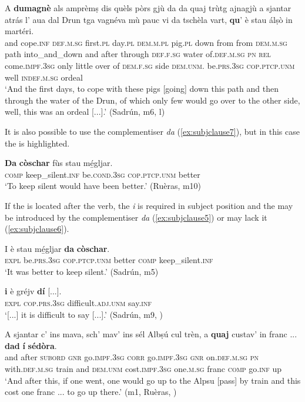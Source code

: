 \ea
\label{ex:subjclause4}
\gll    A \textbf{dumagnè} als amprèmṣ dis quèls pòrs gjù da da quaj trùtg ajnagjù a sjantar atrás l’ aua dal Drun tga vagnéva mù pauc vi da tschèla vart, \textbf{qu}’ è stau álṣò in martéri.\\
and cope.\textsc{inf} \textsc{def.m.sg} first.\textsc{pl}  day.\textsc{pl} \textsc{dem.m.pl}  pig.\textsc{pl} down from from \textsc{dem.m.sg} path into\_and\_down and after through \textsc{def.f.sg} water of.\textsc{def.m.sg}  \textsc{pn} \textsc{rel} come.\textsc{impf.3sg} only little over of \textsc{dem.f.sg} side \textsc{dem.unm.} be.\textsc{prs.3sg} \textsc{cop.ptcp.unm} well \textsc{indef.m.sg} ordeal \\
\glt `And the first days, to cope with these pigs [going] down this path and then through the water of the Drun, of which only few would go over to the other side, well, this was an ordeal [...].' (Sadrún, m6, l)
\z

It is also possible to use the complementiser \textit{da} (\ref{ex:subjclause7}), but in this case the  is highlighted.

\ea
\label{ex:subjclause7}
\gll \textbf{Da} \textbf{còschar} fùs stau mé̱gljar.\\
\textsc{comp} keep\_silent.\textsc{inf} be.\textsc{cond.3sg} \textsc{cop.ptcp.unm} better \\
\glt `To keep silent would have been better.' (Ruèras, m10)
\z

If the  is located after the verb, the  \textit{i} is required in subject position and the  may be introduced by the complementiser \textit{da} (\ref{ex:subjclause5}) or may lack it (\ref{ex:subjclause6}).

\ea
\label{ex:subjclause5}
\gll I è stau mé̱gljar \textbf{da} \textbf{còschar}.\\
\textsc{expl} be.\textsc{prs.3sg} \textsc{cop.ptcp.unm} better \textsc{comp} keep\_silent.\textsc{inf}\\
\glt `It was better to keep silent.' (Sadrún, m5)
\z

\ea
\label{ex:subjclause6}
\gll [...] \textbf{i} è gréjv \longrule {} \textbf{dí} [...].\\
 {} \textsc{expl} \textsc{cop.prs.3sg} difficult.\textsc{adj.unm} {} say.\textsc{inf}\\
\glt `[...] it is difficult to say [...].' (Sadrún, m9, )
\z

\ea
\label{ex:subjclause9}
\gll    A sjantar c’ ins mava, sch’ mav’ ins sél Albṣú cul trèn, a \textbf{quaj} custav’ in franc ... \textbf{dad} \textbf{í} \textbf{sédòra}.\\
and after \textsc{subord} \textsc{gnr}  go.\textsc{impf.3sg} \textsc{corr} go.\textsc{impf.3sg} \textsc{gnr} on.\textsc{def.m.sg} \textsc{pn} with.\textsc{def.m.sg} train and \textsc{dem.unm} cost.\textsc{impf.3sg} one.\textsc{m.sg}  franc {} \textsc{comp} go.\textsc{inf} up\\
\glt `And after this, if one went, one would go up to the Alpsu [pass] by train and this cost one franc ... to go up there.' (m1, Ruèras, )
\z


